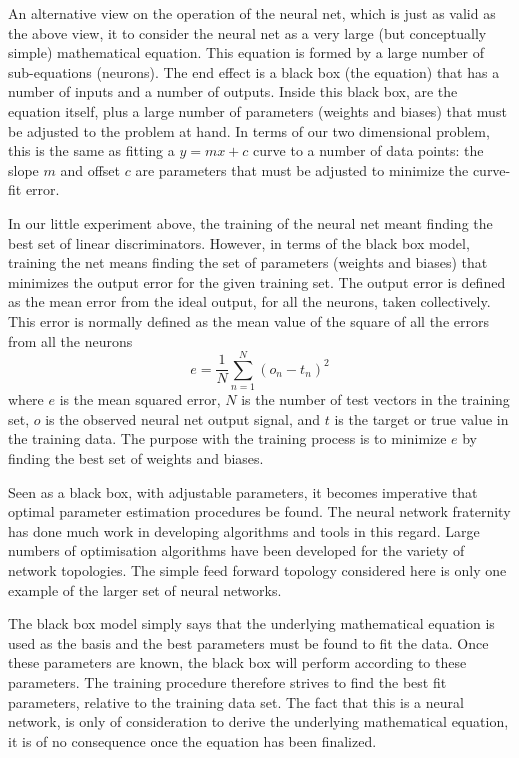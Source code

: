 An alternative view on the operation of the neural net, which is just as valid as the above view, it to consider the neural net as a very large (but conceptually simple) mathematical equation.  This equation is formed by a large number of sub-equations (neurons).  The end effect is a black box (the equation) that has a number of inputs and a number of outputs.  Inside this black box, are the equation itself, plus a large number of parameters (weights and biases) that must be adjusted to the problem at hand.  In terms of our two dimensional problem, this is the same as fitting a $y=mx+c$ curve to a number of data points: the slope $m$ and offset $c$ are parameters that must be adjusted to minimize the curve-fit error.  

In our little experiment above, the training of the neural net meant finding the best set of  linear discriminators.  However, in terms of the black box model, training the net means finding the set of parameters (weights and biases) that minimizes the output error for the given training set.  The output error is defined as the mean error from the ideal output, for all the neurons, taken collectively.  This error is normally defined as the mean value of the square of all the errors from all the neurons
\begin{equation}
e = \frac{1}{N}\sum^N_{n=1}(o_n-t_n)^2
\end{equation}
where $e$  is the mean squared error,  $N$  is the number of test vectors in the training set,  $o$  is the observed neural net output signal, and $t$  is the target or true value in the training data.  The purpose with the training process is to minimize $e$  by finding the best set of weights and biases.  

Seen as a black box, with adjustable parameters, it becomes imperative that optimal parameter estimation procedures be found.  The neural network fraternity has done much work in developing algorithms and tools in this regard.  Large numbers of optimisation algorithms have been developed for the variety of network topologies.  The simple feed forward topology considered here is only one example of the larger set of neural networks.

The black box model simply says that the underlying mathematical equation is used as the basis and the best parameters must be found to fit the data.  Once these parameters are known, the black box will perform according to these parameters.  The training procedure therefore strives to find the best fit parameters, relative to the training data set.  The fact that this is a neural network, is only of consideration to derive the underlying mathematical equation, it is of no consequence once the equation has been finalized.  

